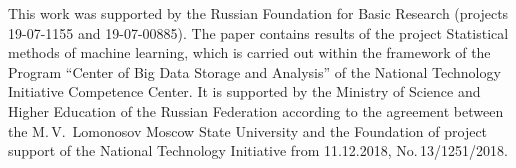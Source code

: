 




\Ack
\noindent
This work was supported by the Russian Foundation for Basic
Research (projects 19-07-1155 and 19-07-00885). 
The paper contains results of the project Statistical 
methods of machine learning, which is carried out within the 
framework of the Program ``Center of Big Data Storage and Analysis'' 
of the National Technology Initiative Competence Center. 
It is supported by the Ministry of Science and Higher Education 
of the Russian Federation according to the agreement between the
 M.\,V.~Lomonosov Moscow State University and the Foundation 
 of project support of the National Technology Initiative from 11.12.2018, 
 No.\,13/1251/2018.
 



